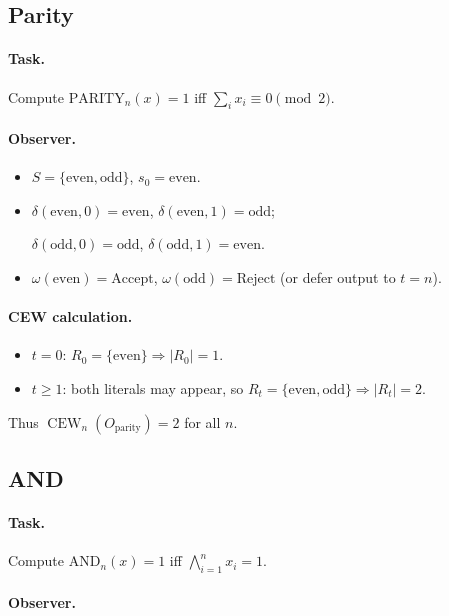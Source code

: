 \documentclass[12pt]{article}
\theoremstyle{definition}
\theoremstyle{definition}
\theoremstyle{remark}
\theoremstyle{remark}
\begin{document}
\subsection{Parity}

\paragraph{Task.} Compute $\mathrm{PARITY}_n(x)=1$ iff $\sum_i x_i\equiv 0\pmod{2}$.

\paragraph{Observer.}
\begin{itemize}
\item $S=\{\mathrm{even},\mathrm{odd}\}$, $s_0=\mathrm{even}$.
\item $\delta(\mathrm{even},0)=\mathrm{even}$, $\delta(\mathrm{even},1)=\mathrm{odd}$;

$\delta(\mathrm{odd},0)=\mathrm{odd}$, $\delta(\mathrm{odd},1)=\mathrm{even}$.
\item $\omega(\mathrm{even})=\mathrm{Accept}$, $\omega(\mathrm{odd})=\mathrm{Reject}$ (or defer output to $t=n$).
\end{itemize}

\paragraph{CEW calculation.}
\begin{itemize}
\item $t=0$: $R_0=\{\mathrm{even}\}\Rightarrow |R_0|=1$.
\item $t\ge 1$: both literals may appear, so $R_t=\{\mathrm{even},\mathrm{odd}\}\Rightarrow |R_t|=2$.
\end{itemize}
Thus $\operatorname{CEW}_n(O_{\mathrm{parity}})=2$ for all $n$.

\subsection{AND}

\paragraph{Task.} Compute $\mathrm{AND}_n(x)=1$ iff $\bigwedge_{i=1}^n x_i=1$.

\paragraph{Observer.}
\end{document}
